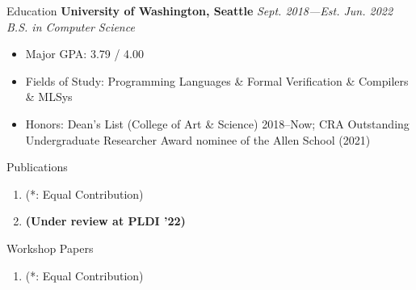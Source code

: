 \documentclass{cv}
\begin{document}
	\begin{rSection}{Education}
	{\bf University of Washington, Seattle} \hfill {\em Sept. 2018---Est. Jun. 2022} \\
	\textit{B.S. in Computer Science}
	\vspace{-5pt}
        \begin{itemize}[leftmargin=*]
            \setlength{\itemsep}{1pt}
            \setlength{\parskip}{0pt}
			\setlength{\parsep}{0pt}
			\item Major GPA: 3.79 / 4.00
            \item Fields of Study: Programming Languages \& Formal Verification \& Compilers \& MLSys
            \item Honors: Dean's List (College of Art \& Science) 2018--Now; CRA Outstanding Undergraduate Researcher Award nominee of the Allen School (2021)
		\end{itemize}
	\end{rSection}
	\vspace{-5pt}
    \begin{rSection}{Publications}
		\begin{enumerate}
			\setlength{\itemsep}{1pt}
            \setlength{\parskip}{0pt}
			\setlength{\parsep}{0pt}
			\item {} (\small{*: Equal Contribution})
			\item \textbf{(Under review at PLDI '22)} 
		\end{enumerate}
        \vspace{-5pt}
	\end{rSection}
	\vspace{1pt}
	\begin{rSection}{Workshop Papers}
		\begin{enumerate}
			\item {} (\small{*: Equal Contribution})
		\end{enumerate}
	\end{rSection}
    \vspace{1pt}
\end{document}

